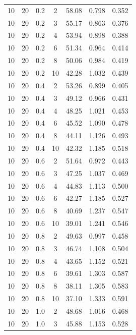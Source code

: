 \documentclass[11pt,a4paper]{article}
\begin{document}
\begin{longtable}{ccccccc}
        \midrule
        10 &  20  &  0.2  & 2 & 58.08 & 0.798 & 0.352 \\
        10 &  20  &  0.2  & 3 & 55.17 & 0.863 & 0.376 \\
        10 &  20  &  0.2  & 4 & 53.94 & 0.898 & 0.388 \\
        10 &  20  &  0.2  & 6 & 51.34 & 0.964 & 0.414 \\
        10 &  20  &  0.2  & 8 & 50.06 & 0.984 & 0.419 \\
        10 &  20  &  0.2  & 10 & 42.28 & 1.032 & 0.439 \\
        \midrule
        10 &  20  &  0.4  & 2 & 53.26 & 0.899 & 0.405 \\
        10 &  20  &  0.4  & 3 & 49.12 & 0.966 & 0.431 \\
        10 &  20  &  0.4  & 4 & 48.25 & 1.021 & 0.453 \\
        10 &  20  &  0.4  & 6 & 45.52 & 1.090 & 0.478 \\
        10 &  20  &  0.4  & 8 & 44.11 & 1.126 & 0.493 \\
        10 &  20  &  0.4  & 10 & 42.32 & 1.185 & 0.518 \\
        \midrule
        10 &  20  &  0.6  & 2 & 51.64 & 0.972 & 0.443 \\
        10 &  20  &  0.6  & 3 & 47.25 & 1.037 & 0.469 \\
        10 &  20  &  0.6  & 4 & 44.83 & 1.113 & 0.500 \\
        10 &  20  &  0.6  & 6 & 42.27 & 1.185 & 0.527 \\
        10 &  20  &  0.6  & 8 & 40.69 & 1.237 & 0.547 \\
        10 &  20  &  0.6  & 10 & 39.01 & 1.241 & 0.546 \\
        \midrule
        10 &  20  &  0.8  & 2 & 49.63 & 0.997 & 0.458 \\
        10 &  20  &  0.8  & 3 & 46.74 & 1.108 & 0.504 \\
        10 &  20  &  0.8  & 4 & 43.65 & 1.152 & 0.521 \\
        10 &  20  &  0.8  & 6 & 39.61 & 1.303 & 0.587 \\
        10 &  20  &  0.8  & 8 & 38.11 & 1.305 & 0.583 \\
        10 &  20  &  0.8  & 10 & 37.10 & 1.333 & 0.591 \\
        \midrule
        10 &  20  &  1.0  & 2 & 48.68 & 1.016 & 0.468 \\
        10 &  20  &  1.0  & 3 & 45.88 & 1.153 & 0.528 \\

\end{longtable}
\end{document}
